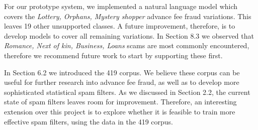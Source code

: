 For our prototype system, we implemented a natural language model which covers the \textit{Lottery, Orphans, Mystery shopper} advance fee fraud variations. This leaves 19 other unsupported classes. A future improvement, therefore, is to develop models to cover all remaining variations. In Section 8.3 we observed that \textit{Romance, Next of kin, Business, Loans} scams are most commonly encountered, therefore we recommend future work to start by supporting these first.

In Section 6.2 we introduced the 419 corpus. We believe these corpus can be useful for further research into advance fee fraud, as well as to develop more sophisticated statistical spam filters. As we discussed in Section 2.2, the current state of spam filters leaves room for improvement. Therefore, an interesting extension over this project is to explore whether it is feasible to train more effective spam filters, using the data in the 419 corpus.